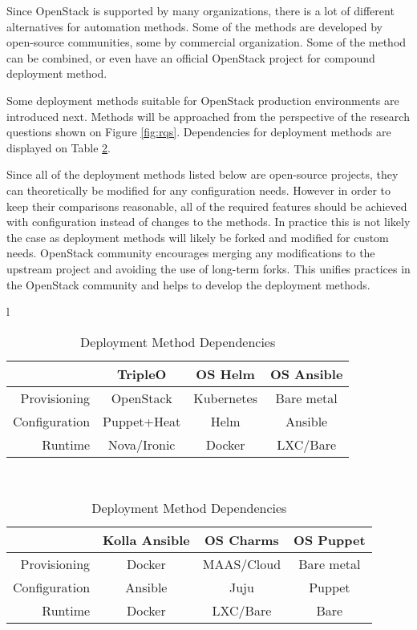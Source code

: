 Since OpenStack is supported by many organizations, there is a lot of different
alternatives for automation methods. Some of the methods are developed by
open-source communities, some by commercial organization. Some of the method
can be combined, or even have an official OpenStack project for compound
deployment method.

Some deployment methods suitable for OpenStack production environments are
introduced next. Methods will be approached from the perspective of the
research questions shown on Figure \ref{fig:rqs}. Dependencies for deployment
methods are displayed on Table \ref{tab:dependencies}.

Since all of the deployment methods listed below are open-source projects, they
can theoretically be modified for any configuration needs. However in order to
keep their comparisons reasonable, all of the required features should be
achieved with configuration instead of changes to the methods. In practice this
is not likely the case as deployment methods will likely be forked and modified
for custom needs. OpenStack community encourages merging any modifications to
the upstream project and avoiding the use of long-term forks. This unifies
practices in the OpenStack community and helps to develop the deployment
methods.

\begin{table}[t]
\centering
\begin{tabular}{ l }
\begin{tabular} {r | c c c } \\
              & TripleO     & OS Helm     & OS Ansible  \\
\hline
Provisioning  & OpenStack   & Kubernetes  & Bare metal  \\
Configuration & Puppet+Heat & Helm        & Ansible     \\
Runtime       & Nova/Ironic & Docker      & LXC/Bare    \\
\end{tabular} \\
\begin{tabular} {r | c c c } \\
              & Kolla Ansible & OS Charms   & OS Puppet \\
\hline
Provisioning  & Docker        & MAAS/Cloud  & Bare metal\\
Configuration & Ansible       & Juju        & Puppet    \\
Runtime       & Docker        & LXC/Bare    & Bare      \\
\end{tabular}
\end{tabular}
\caption{Deployment Method Dependencies}
\label{tab:dependencies}
\end{table}

